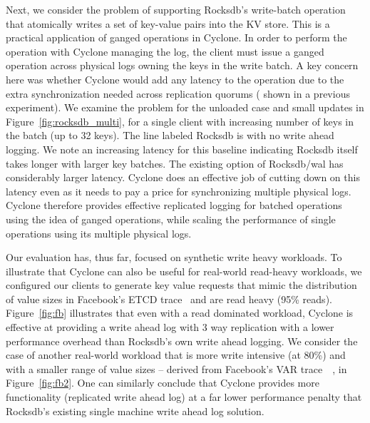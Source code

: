 \documentclass[pageno]{jpaper}
\begin{document}
Next, we consider the problem of supporting Rocksdb's write-batch operation that
atomically writes a set of key-value pairs into the KV store. This is a
practical application of ganged operations in Cyclone. In order to
perform the operation with Cyclone managing the log, the client must issue a
ganged operation across physical logs owning the keys in the write batch.
A key concern here was whether Cyclone would add any latency to the
operation due to the extra synchronization needed across replication quorums (
shown in a previous experiment).
We examine the problem for the unloaded case
and small updates in Figure~\ref{fig:rocksdb_multi}, for a single client with
increasing number of keys in the batch (up to 32 keys).
The line labeled Rocksdb is with no write ahead logging. We note an increasing
latency for this baseline indicating Rocksdb itself takes longer
with larger key batches. The existing option of Rocksdb/wal has considerably
larger latency. Cyclone does an effective job of cutting down on this latency
even as it needs to pay a price for synchronizing multiple physical
logs. Cyclone therefore provides effective replicated logging for batched
operations using the idea of ganged operations, while scaling the performance of
single operations using its multiple physical logs.

Our evaluation has, thus far, focused on synthetic write heavy workloads. To
illustrate that Cyclone can also be useful for real-world read-heavy workloads, 
we configured our clients to generate key value requests that mimic the
distribution of value sizes in Facebook's ETCD
trace~\cite{fb_workload_analysis,fb_scaling_memcache} and are read heavy (95\%
reads). Figure~\ref{fig:fb} illustrates that even with a read dominated
workload, Cyclone is effective at providing a write ahead log with 3 way
replication with a lower performance overhead than Rocksdb's own write ahead
logging. We consider the case of another real-world workload that is more write 
intensive (at 80\%) and with a smaller range of value sizes -- derived from
Facebook's VAR trace~~\cite{fb_workload_analysis,fb_scaling_memcache}, in
Figure~\ref{fig:fb2}. One can similarly conclude that Cyclone provides more
functionality (replicated write ahead log) at a far lower performance penalty
that Rocksdb's existing single machine write ahead log solution.
\end{document}
